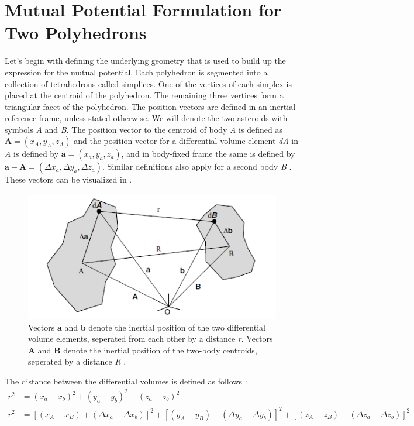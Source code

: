 \section{Mutual Potential Formulation for Two Polyhedrons}
\label{mutual_pot}
Let's begin with defining the underlying geometry that is used to build up the expression for the mutual potential. Each polyhedron is segmented into a collection of tetrahedrons called simplices. One of the vertices of each simplex is placed at the centroid of the polyhedron. The remaining three vertices form a triangular facet of the polyhedron. The position vectors are defined in an inertial reference frame, unless stated otherwise. We will denote the two asteroids with symbols \textit{A} and \textit{B}. The position vector to the centroid of body \textit{A} is defined as $\mathbf{A} = (x_A, y_A, z_A)$ and the position vector for a differential volume element \textit{dA} in \textit{A} is defined by $\mathbf{a} = (x_a, y_a, z_a)$, and in body-fixed frame the same is defined by $\mathbf{a}-\mathbf{A} = (\Delta x_a, \Delta y_a, \Delta z_a)$. Similar definitions also apply for a second body \textit{B} \cite{werner_poly}. These vectors can be visualized in .
%
\begin{figure}[h]
\centering
\captionsetup{justification=centering}
\includegraphics[scale=0.7]{poly1.png}
\caption{Vectors \textbf{a} and \textbf{b} denote the inertial position of the two differential volume elements, seperated from each other by a distance \textit{r}. Vectors \textbf{A} and \textbf{B} denote the inertial position of the two-body centroids, seperated by a distance \textit{R} \cite{werner_poly}.}
\label{fig:poly1}
\end{figure}
\FloatBarrier
%
The distance between the differential volumes is defined as follows \cite{werner_poly}:
\begin{align}
\label{r_def1}
r^2 &= (x_a - x_b)^2 + (y_a - y_b)^2 + (z_a - z_b)^2\\
\label{r_def2}
r^2 &= [(x_A - x_B) + (\Delta x_a - \Delta x_b)]^2 + [(y_A - y_B) + (\Delta y_a - \Delta y_b)]^2 + [(z_A - z_B) + (\Delta z_a - \Delta z_b)]^2
\end{align}
